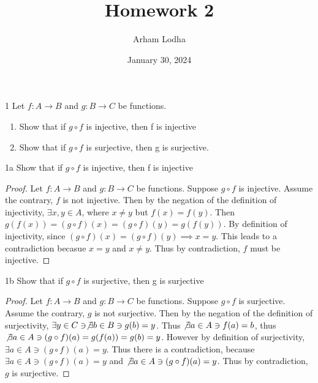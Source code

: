 \documentclass{article}
\begin{document}
\title{Homework 2}
\author{Arham Lodha}%
\date{January 30, 2024}%
\maketitle

\begin{PROB}{1}\label{Problem 1.}
    Let $f : A \to B$ and $g : B \to C$ be functions.

    \begin{enumerate}
        \item Show that if $g \circ f$ is injective, then f is injective
        \item Show that if $g \circ f$ is surjective, then g is surjective.
    \end{enumerate}
    
\end{PROB}
\begin{claim}{1a}\label{Claim 1a.}
    Show that if $g \circ f$ is injective, then f is injective
\end{claim}
\begin{proof}
    Let $f : A \to B$ and $g : B \to C$ be functions. Suppose $g \circ f$ is injective. Assume the contrary, $f$ is not injective. Then by the negation of the definition of injectivity, $\exists x, y \in A$, where $x \neq y$ but $f(x) = f(y)$. Then $g(f(x)) = (g \circ f)(x) = (g \circ f)(y) = g(f(y))$. By definition of injectivity, since $(g \circ f)(x) = (g \circ f)(y) \implies x = y$. This leads to a contradiction becasue $x = y$ and $x \neq y$. Thus by contradiction, $f$ must be injective.              
\end{proof}
\begin{claim}{1b}\label{Claim 1a.}
    Show that if $g \circ f$ is surjective, then g is surjective
\end{claim}
\begin{proof}
    Let $f : A \to B$ and $g : B \to C$ be functions. Suppose $g \circ f$ is surjective. Assume the contrary, $g$ is not surjective. Then by the negation of the definition of surjectivity, $\exists y \in C \ni \not \exists b \in B \ni g(b) = y$. Thus $\not \exists a \in A \ni f(a) = b$, thus $\not \exists a \in A \ni (g \circ f)(a) = g(f(a)) = g(b) = y$. However by definition of surjectivity, $\exists a \in A \ni (g \circ f)(a) = y$. Thus there is a contradiction, because $\exists a \in A \ni (g \circ f)(a) = y$ and $\not \exists a \in A \ni (g \circ f)(a) = y$. Thus by contradiction, $g$ is surjective.         
\end{proof}
\end{document}

